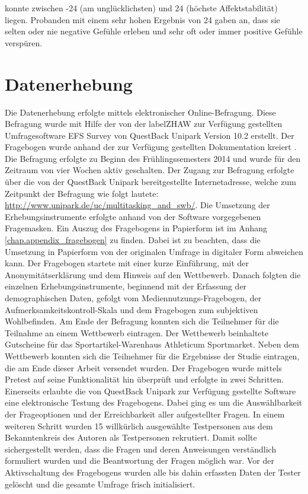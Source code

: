 konnte zwischen -24 (am unglücklichsten) und 24 (höchste Affektstabilität) liegen. Probanden mit einem sehr hohen Ergebnis von 24 gaben an, dass sie selten oder nie negative Gefühle erleben und sehr oft oder immer positive Gefühle verspüren.

\section{Datenerhebung}\label{section.datenerhebung}
Die Datenerhebung erfolgte mittels elektronischer Online-Befragung. Diese Befragung wurde mit Hilfe der von der \gls{labelZHAW} zur Verfügung gestellten Umfragesoftware EFS Survey von QuestBack Unipark Version 10.2 erstellt. Der Fragebogen wurde anhand der zur Verfügung gestellten Dokumentation kreiert \cite{QuestBack2014}. Die Befragung erfolgte zu Beginn des Frühlingssemesters 2014 und wurde für den Zeitraum von vier Wochen aktiv geschalten. Der Zugang zur Befragung erfolgte über die von der QuestBack Unipark bereitgestellte Internetadresse, welche zum Zeitpunkt der Befragung wie folgt lautete: \url{http://www.unipark.de/uc/multitasking_and_swb/}. Die Umsetzung der Erhebungsinstrumente erfolgte anhand von der Software vorgegebenen Fragemasken. Ein Auszug des Fragebogens in Papierform ist im Anhang \ref{chap.appendix_fragebogen} zu finden. Dabei ist zu beachten, dass die Umsetzung in Papierform von der originalen Umfrage in digitaler Form abweichen kann. Der Fragebogen startete mit einer kurze Einführung, mit der Anonymitätserklärung und dem Hinweis auf den Wettbewerb. Danach folgten die einzelnen Erhebungsinstrumente, beginnend mit der Erfassung der demographischen Daten, gefolgt vom Mediennutzungs-Fragebogen, der Aufmerksamkeitskontroll-Skala und dem Fragebogen zum subjektiven Wohlbefinden. Am Ende der Befragung konnten sich die Teilnehmer für die Teilnahme an einem Wettbewerb eintragen. Der Wettbewerb beinhaltete Gutscheine für das Sportartikel-Warenhaus Athleticum Sportmarket. Neben dem Wettbewerb konnten sich die Teilnehmer für die Ergebnisse der Studie eintragen, die am Ende dieser Arbeit versendet wurden. Der Fragebogen wurde mittels Pretest auf seine Funktionalität hin überprüft und erfolgte in zwei Schritten. Einerseits erlaubte die von QuestBack Unipark zur Verfügung gestellte Software eine elektronische Testung des Fragebogens. Dabei ging es um die Auswählbarkeit der Frageoptionen und der Erreichbarkeit aller aufgestellter Fragen. In einem weiteren Schritt wurden 15 willkürlich ausgewählte Testpersonen aus dem Bekanntenkreis des Autoren als Testpersonen rekrutiert. Damit sollte sichergestellt werden, dass die Fragen und deren Anweisungen verständlich formuliert wurden und die Beantwortung der Fragen möglich war. Vor der Aktivschaltung des Fragebogens wurden alle bis dahin erfassten Daten der Tester gelöscht und die gesamte Umfrage frisch initialisiert. 


